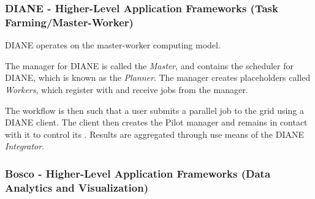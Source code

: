 \documentclass{sig-alternate}
\begin{document}
\subsubsection{DIANE - Higher-Level Application Frameworks 
  (Task Farming/Master-Worker)}
DIANE operates on the master-worker computing model.

The manager for DIANE is called the \textit{Master}, and contains
the scheduler for DIANE, which is known as the \textit{Planner}.
The manager creates placeholders called \textit{Workers}, which
register with and receive jobs from the manager.

The workflow is then such that a user submits a parallel job to
the grid using a DIANE client.  The client then creates the Pilot manager
and remains in contact with it to control its \pilotjobs.  Results
are aggregated through use means of the DIANE \textit{Integrator}.

\subsubsection{Bosco - Higher-Level Application Frameworks 
  (Data Analytics and Visualization)}

\end{document}
